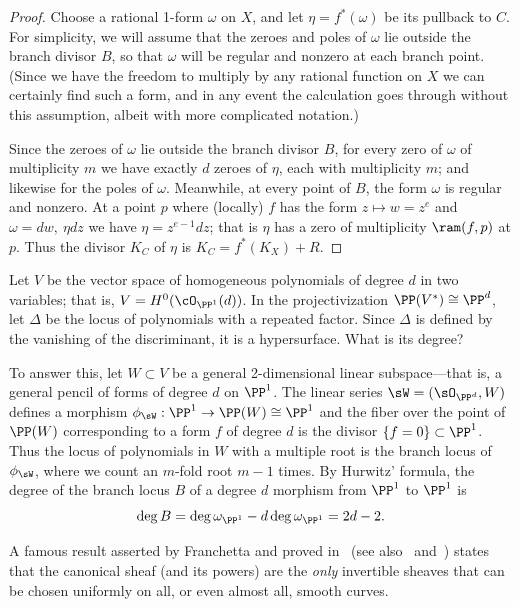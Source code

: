  
\begin{proof}
Choose a rational 1-form $\omega$ on $X$, and let $\eta = f^*(\omega)$ be its pullback to $C$. For simplicity, we will assume that the zeroes and poles of $\omega$ lie outside the branch divisor $B$, so that $\omega$ will be regular and nonzero at each branch point. (Since we have the freedom to multiply by any rational function on $X$ we can certainly find such a form, and in any event the calculation goes through without this assumption, albeit with more complicated notation.) 

Since the zeroes of $\omega$ lie outside the branch divisor $B$, for every zero of $\omega$ of multiplicity $m$ we have exactly $d$ zeroes of $\eta$, each with multiplicity $m$; and likewise for the poles of $\omega$. Meanwhile, at every point of $B$, the form $\omega$ is regular and nonzero. At a point $p$ where (locally) $f$ has the form $z \mapsto w = z^{e}$
and $\omega = dw,\ \eta dz$ we have $\eta = z^{e-1}dz$; that is $\eta$ has a zero of multiplicity $\ram(f,p)$ at  $p$.
Thus the divisor $K_{C}$ of $\eta$ is
$K_{C} = f^{*}(K_{X})+R$.
\end{proof}

\begin{example}
 Let $V$ be the vector space of homogeneous polynomials of degree $d$ in two variables; that is, $V = H^0(\cO_{\PP^1}(d))$. In the projectivization $\PP(V^{*}) \cong \PP^d$, let $\Delta$ be the locus of polynomials with a repeated factor. Since $\Delta$ is defined by the vanishing of the discriminant, it is a hypersurface. What is its degree?
 
 To answer this, let $W\subset V$ be a general 2-dimensional linear subspace---that is, a general pencil of forms of degree $d$ on $\PP^1$. The linear series $\sW = (\sO_{\PP^{d}}, W)$ defines a morphism $\phi_{\sW} : \PP^{1} \to \PP(W) \cong \PP^{1}$ and the fiber over the point of $\PP(W)$ corresponding to a form $f$ of degree $d$ is the divisor $\{f = 0\}\subset \PP^{1}$. Thus the locus of polynomials in $W$ with a multiple root is the branch locus of $\phi_{\sW}$, where we count an $m$-fold root $m-1$ times.
 By Hurwitz' formula, the degree of the branch locus $B$ of a degree $d$ morphism from $\PP^{1}$ to $\PP^{1}$ is
 $$
 \deg B = \deg \omega_{\PP^{1}} - d\deg \omega_{\PP^{1}} = 2d-2.
 $$
 \end{example}
  
\begin{fact}
A famous result asserted by Franchetta and proved in~\cite{Harer} (see also~\cite{MR895568} and~\cite{MR1984659}) states that the canonical sheaf (and its powers) are the \emph{only} invertible sheaves that can be chosen uniformly on all, or even almost all, smooth curves. 
\end{fact}

